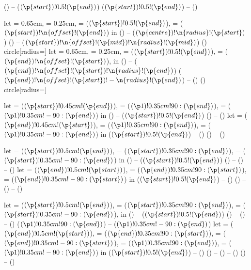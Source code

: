 () -- ($(\p{start})!0.5!(\p{end})$)
($(\p{start})!0.5!(\p{end})$) -- ()

let
 = {0.65cm},
 = {0.25cm},
    = ($(\p{start})!0.5!(\p{end})$),
 = ($(\p{start})!\n{offset}!(\p{end})$)
in
() -- ($(\p{centre})!\n{radius}!(\p{start})$)
() -- ($(\p{start})!\n{offset}!(\p{mid})!\n{radius}!(\p{mid})$)
() circle[radius=]
let
 = {0.65cm},
 = {0.25cm},
    = ($(\p{start})!0.5!(\p{end})$),
 = ($(\p{end})!\n{offset}!(\p{start})$),
in
() -- ($(\p{end})!\n{offset}!(\p{start})!\n{radius}!(\p{end})$)
($(\p{end})!\n{offset}!(\p{start})!-\n{radius}!(\p{end})$) -- ()
() circle[radius=]

let
 = ($(\p{start})!0.45cm!(\p{end})$),
 = ($(\p1)!0.35cm!90:(\p{end})$),
 = ($(\p1)!0.35cm!-90:(\p{end})$)
in
() -- ($(\p{start})!0.5!(\p{end})$)
() -- ()
let
 = ($(\p{end})!0.45cm!(\p{start})$),
 = ($(\p1)!0.35cm!90:(\p{end})$),
 = ($(\p1)!0.35cm!-90:(\p{end})$)
in
($(\p{start})!0.5!(\p{end})$) -- ()
() -- ()

let
 = ($(\p{start})!0.5cm!(\p{end})$),
 = ($(\p{start})!0.35cm!90:(\p{end})$),
 = ($(\p{start})!0.35cm!-90:(\p{end})$)
in
() -- ($(\p{start})!0.5!(\p{end})$)
() -- () -- ()
let
 = ($(\p{end})!0.5cm!(\p{start})$),
 = ($(\p{end})!0.35cm!90:(\p{start})$),
 = ($(\p{end})!0.35cm!-90:(\p{start})$)
in
($(\p{start})!0.5!(\p{end})$) -- ()
() -- () -- ()

let
 = ($(\p{start})!0.5cm!(\p{end})$),
 = ($(\p{start})!0.35cm!90:(\p{end})$),
 = ($(\p{start})!0.35cm!-90:(\p{end})$),
in
() -- ($(\p{start})!0.5!(\p{end})$)
() -- () -- ()
($(\p1)!0.35cm!90:(\p{end})$) -- ($(\p1)!0.35cm!-90:(\p{end})$)
let
 = ($(\p{end})!0.5cm!(\p{start})$),
 = ($(\p{end})!0.35cm!90:(\p{start})$),
 = ($(\p{end})!0.35cm!-90:(\p{start})$),
 = ($(\p1)!0.35cm!90:(\p{end})$),
 = ($(\p1)!0.35cm!-90:(\p{end})$)
in
($(\p{start})!0.5!(\p{end})$) -- ()
() -- () -- ()
() -- ()

